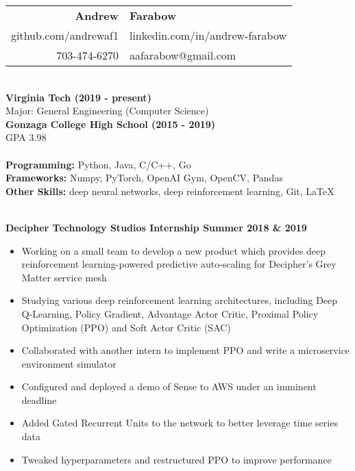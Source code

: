 \documentclass{article}
\begin{document}
  \begin{center}
    \begin{tabular}{r l}
      {\huge\textbf{Andrew}} & {\huge\textbf{Farabow}} \\
      \hspace{35pt} github.com/andrewaf1 & linkedin.com/in/andrew-farabow \\
      703-474-6270 & aafarabow@gmail.com \\
    \end{tabular}


  \begin{flushleft}
    \begin{multicols}{2}
      {\large\textbf{\underline{}}} \\
       \textbf{Virginia Tech	(2019 - present)} \\
      Major: General Engineering (Computer Science) \\
      \textbf{Gonzaga College High School	(2015 - 2019)} \\
      GPA 3.98 \\
     

    \columnbreak
    {\large\textbf{\underline{}}} \\
    {\textbf{Programming:}} Python, Java, C/C++, Go \\
    {\textbf{Frameworks:}} Numpy, PyTorch, OpenAI Gym, OpenCV, Pandas \\
    {\textbf{Other Skills:}} deep neural networks, deep reinforcement learning, Git, LaTeX \\

    \end{multicols}

    {\large\textbf{\underline{}}} \\
    \textbf{Decipher Technology Studios Internship \hfill Summer 2018 \& 2019}
    \begin{itemize}
      \item Working on a small team to develop a new product which provides deep reinforcement learning-powered predictive auto-scaling for Decipher's Grey Matter service mesh
      \item Studying various deep reinforcement learning architectures, including Deep Q-Learning, Policy Gradient, Advantage Actor Critic, Proximal Policy Optimization (PPO) and Soft Actor Critic (SAC)
      \item Collaborated with another intern to implement PPO and write a microservice environment simulator
      \item Configured and deployed a demo of Sense to AWS under an imminent deadline
      \item Added Gated Recurrent Units to the network to better leverage time series data
      \item Tweaked hyperparameters and restructured PPO to improve performance
    \end{itemize}



\end{flushleft}
\end{center}
\end{document}
